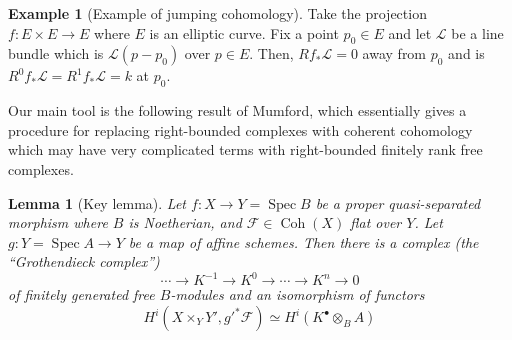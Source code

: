 \documentclass[10pt]{article}
\newtheorem{lemma}[thm]{Lemma}
\theoremstyle{definition}
\newtheorem{exmp}[thm]{Example}
\DeclareMathOperator{\Coh}{Coh}
\DeclareMathOperator{\Spec}{Spec}
\newcommand{\LL}{\mathcal{L}}
\begin{document}
\begin{exmp}[Example of jumping cohomology]
Take the projection $f: E \times E \rightarrow E$ where $E$ is an elliptic curve.  Fix a point $p_0 \in E$ and let $\mathcal{L}$ be a line bundle which is $\LL(p - p_0)$ over $p \in E$.  Then, $Rf_* \mathcal{L} = 0$ away from $p_0$ and is $R^0f_* \mathcal{L} = R^1 f_* \mathcal{L} = k$ at $p_0$.
\end{exmp}

Our main tool is the following result of Mumford, which essentially gives a procedure for replacing right-bounded complexes with coherent cohomology which may have very complicated terms with right-bounded finitely rank free complexes.
\begin{lemma}[Key lemma]
Let $f: X \rightarrow Y  = \Spec B$ be a proper quasi-separated morphism where $B$ is Noetherian, and $\mathcal{F} \in \Coh(X)$ flat over $Y$.  Let $g: Y = \Spec A \rightarrow Y$ be a map of affine schemes.  Then there is a complex (the ``Grothendieck complex'')
$$\cdots \rightarrow K^{-1} \rightarrow K^0 \rightarrow \cdots \rightarrow K^n \rightarrow 0$$
of finitely generated free $B$-modules and an isomorphism of functors
$$H^i(X \times_Y Y', g'^* \mathcal{F}) \simeq H^i(K^\bullet \otimes_B A)$$
\end{lemma}
\end{document}
